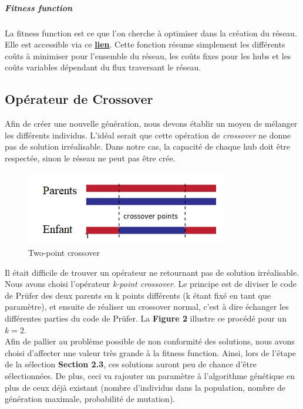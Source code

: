 \documentclass{article} %
\begin{document}
\subparagraph{Fitness function\\}
La fitness function est ce que l'on cherche à optimiser dans la création du réseau. Elle est accessible via ce \href{http://formations.telecom-bretagne.eu/or/courses/2018-2019-ISA/03/03.html}{\underline{\textbf{\textcolor[rgb]{0,0,1}{lien}}}}. Cette fonction résume simplement les différents coûts à minimiser pour l'ensemble du réseau, les coûts fixes pour les hubs et les coûts variables dépendant du flux traversant le réseau.

\subsection{Opérateur de Crossover}
Afin de créer une nouvelle génération, nous devons établir un moyen de mélanger les différents individus. L'idéal serait que cette opération de \textit{crossover} ne donne pas de solution irréalisable. Dans notre cas, la capacité de chaque hub doit être respectée, sinon le réseau ne peut pas être crée.\\ 

\begin{figure}
	\centering
	\includegraphics[keepaspectratio = true,scale=0.8]{kpoint.png}
	\caption{Two-point crossover}
\end{figure}
Il était difficile de trouver un opérateur ne retournant pas de solution irréalisable. Nous avons choisi l'opérateur \textit{k-point crossover}. Le principe est de diviser le code de Prüfer des deux parents en k points différents (k étant fixé en tant que paramètre), et ensuite de réaliser un crossover normal, c'est à dire échanger les différentes parties du code de Prüfer. La \textbf{Figure 2} illustre ce procédé pour un $k=2$.\\
Afin de pallier au problème possible de non conformité des solutions, nous avons choisi d'affecter une valeur très grande à la fitness function. Ainsi, lors de l'étape de la sélection \textbf{Section 2.3}, ces solutions auront peu de chance d'être sélectionnées. De plus, ceci va rajouter un paramètre à l'algorithme génétique en plus de ceux déjà existant (nombre d'individus dans la population, nombre de génération maximale, probabilité de mutation).
\end{document}
